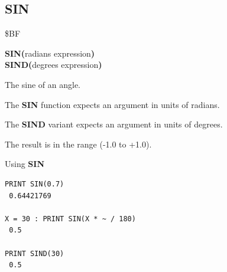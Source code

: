 \subsection{SIN}
\begin{description}[leftmargin=2cm,style=nextline]
\item [Token:]    \$BF

\item [Format:]   {\bf SIN(}radians expression{\bf )} \\
                  {\bf SIND(}degrees expression{\bf )}

\item [Returns:]  The sine of an angle.

                  The {\bf SIN} function expects an argument in units of radians.

                  The {\bf SIND} variant expects an argument in units of degrees.

                  The result is in the range (-1.0 to +1.0).

\item [Examples:] Using {\bf SIN}

\begin{tcolorbox}[colback=black,coltext=white]
\verbatimfont{\codefont}
\begin{verbatim}
PRINT SIN(0.7)
 0.64421769

X = 30 : PRINT SIN(X * ~ / 180)
 0.5

PRINT SIND(30)
 0.5
\end{verbatim}
\end{tcolorbox}
\end{description}


\newpage
